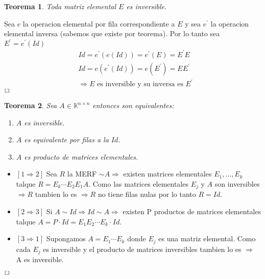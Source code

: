 \documentclass[]{article}
\newtheorem{theorem}{Teorema}
\newenvironment{proof}{\noindent{\bf Prueba:}}{$\hfill \Box$ \vspace{10pt}}
\begin{document}
\begin{theorem}
    Toda matriz elemental $E$ es inversible.
\end{theorem}
\begin{proof}
    Sea $e$ la operacion elemental por fila correspondiente a $E$ y sea $e^{\prime}$ la operacion elemental inversa
    (sabemos que existe por teorema). Por lo tanto sea $E^{\prime}=e^{\prime}(Id)$
    \begin{align*}
        &Id=e^{\prime}(e(Id))=e^{\prime}(E)=E^{\prime}E\\
        &Id=e(e^{\prime}(Id))=e(E^{\prime})=EE^{\prime}\\
        &\Longrightarrow E \text{ es inversible y su inversa es } E^{\prime}
    \end{align*}
\end{proof}
\begin{theorem}
    Sea $A \in\mathbb{K}^{n\times n}$ entonces son equivalentes:
    \begin{enumerate}
        \item $A$ es inversible.
        \item $A$ es equivalente por filas a la $Id$.
        \item $A$ es producto de matrices elementales.
    \end{enumerate}
\end{theorem}
\begin{proof}
    \begin{itemize}
        \item $[1 \Longrightarrow 2]$ Sea $R$ la MERF $\sim A \Longrightarrow$ existen matrices elementales
        $E_1, \dots ,E_k$ talque $R=E_k\cdots E_2E_1A$. Como las matrices elementales $E_j$ y $A$ son inversibles
        $\Longrightarrow R$ tambien lo es $\Longrightarrow R$ no tiene filas nulas por lo tanto $R=Id$.
        \item $[2 \Longrightarrow 3]$ Si $A \sim Id \Longrightarrow Id \sim A \Longrightarrow$ existen P productos
        de matrices elementales talque $A = P \cdot Id = E_1E_2 \cdots E_k \cdot Id$.
        \item $[3 \Longrightarrow 1]$ Supongamos $A=E_1 \cdots E_k$ donde $E_j$ es una matriz elemental. Como cada
        $E_j$ es inversible y el producto de matrices inversibles tambien lo es $\Longrightarrow$ A es inversible.
    \end{itemize}
\end{proof}
\end{document}
